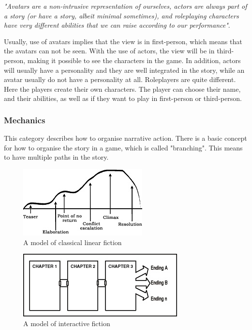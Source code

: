\emph{"Avatars are a non-intrusive representation of ourselves, actors are always part of a story (or have a story, albeit minimal sometimes), and roleplaying characters have very different abilities that we can raise according to our performance"}. \cite{understandingvg}

Usually, use of avatars implies that the view is in first-person, which means that the avatars can not be seen. With the use of actors, the view will be in third-person, making it possible to see the characters in the game. In addition, actors will usually have a personality and they are well integrated in the story, while an avatar usually do not have a personality at all. Roleplayers are quite different. Here the players create their own characters. The player can choose their name, and their abilities, as well as if they want to play in first-person or third-person.  

\subsubsection{Mechanics}
This category describes how to organise narrative action. There is a basic concept for how to organise the story in a game, which is called "branching". This means to have multiple paths in the story. 

\begin{figure}
\begin{center}
\includegraphics[scale=1.0]{linearFiction}
\caption[Classical linear fiction]{A model of classical linear fiction \cite{understandingvg}}
\label{fig:linearfiction}
\end{center}
\end{figure} 
\begin{figure}
\begin{center}
\includegraphics[scale=1.0]{interactiveFiction}
\caption[Interactive fiction]{A model of interactive fiction \cite{understandingvg}}
\label{fig:interactivefiction}
\end{center}
\end{figure} 

